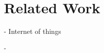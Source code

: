 \documentclass[../main/Self-Stabilization.tex]{subfiles}
\begin{document}
\section{Related Work}

- Internet of things 

- 
\end{document}
